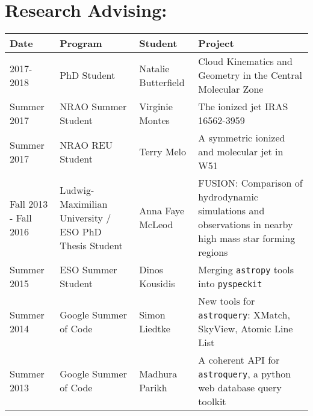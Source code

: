 \setlength{\extrarowheight}{4pt}
\section*{Research Advising: }
\vspace{-12pt}
\begin{tabular}{p{0.75in}p{1.2in}lp{2.6in}}
    Date  & Program & Student &  Project \\
    \hline
    2017-2018 & PhD Student &                                                        Natalie Butterfield &  Cloud Kinematics and Geometry in the Central Molecular Zone \\
    Summer 2017 & NRAO Summer Student &                                              Virginie Montes    &  The ionized jet IRAS 16562-3959 \\
    Summer 2017 & NRAO REU Student &                                                 Terry Melo    &  A symmetric ionized and molecular jet in W51 \\
    Fall 2013 - Fall 2016 & Ludwig-Maximilian University / ESO PhD Thesis Student & Anna Faye McLeod &  FUSION: Comparison of hydrodynamic simulations and observations in nearby high mass star forming regions  \\
    Summer 2015 & ESO Summer Student &                                                 Dinos Kousidis    &  Merging \texttt{astropy} tools into \texttt{pyspeckit} \\
    Summer 2014 & Google Summer of Code &                                                 Simon Liedtke    &  New tools for \texttt{astroquery}: XMatch, SkyView, Atomic Line List \\
    Summer 2013 & Google Summer of Code &                                                 Madhura Parikh   &  A coherent API for \texttt{astroquery}, a python web database query toolkit \\
\end{tabular}

